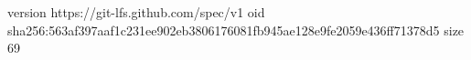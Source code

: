 version https://git-lfs.github.com/spec/v1
oid sha256:563af397aaf1c231ee902eb3806176081fb945ae128e9fe2059e436ff71378d5
size 69
